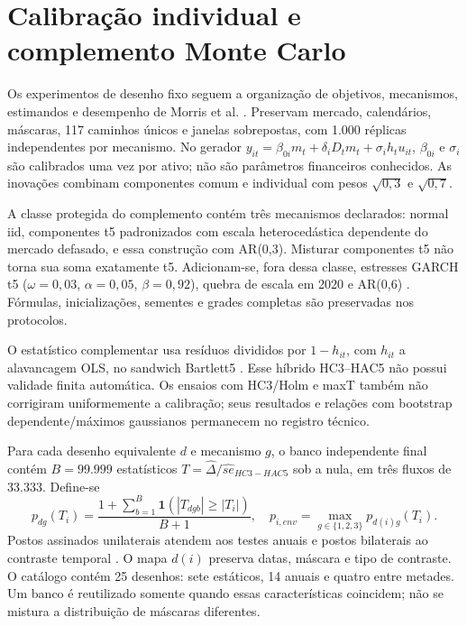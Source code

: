 \section{Calibração individual e complemento Monte Carlo}
Os experimentos de desenho fixo seguem a organização de objetivos,
mecanismos, estimandos e desempenho de Morris et al. \cite{morris2019}.
Preservam mercado, calendários, máscaras, 117 caminhos únicos e janelas
sobrepostas, com 1.000 réplicas independentes por mecanismo.
No gerador $y_{it}=\beta_{0i}m_t+\delta_iD_tm_t+\sigma_i h_tu_{it}$,
$\beta_{0i}$ e $\sigma_i $ são calibrados uma vez por ativo; não são
parâmetros financeiros conhecidos. As inovações combinam componentes
comum e individual com pesos $\sqrt{0,3}$ e $\sqrt{0,7}$.

A classe protegida do complemento contém três mecanismos declarados:
normal iid, componentes t5 padronizados com escala heterocedástica
dependente do mercado defasado, e essa construção com AR(0,3).
Misturar componentes t5 não torna sua soma exatamente t5.
Adicionam-se, fora dessa classe, estresses GARCH t5
($\omega=0,03$, $\alpha=0,05$, $\beta=0,92$), quebra de escala
em 2020 e AR(0,6) \cite{bollerslev1986}. Fórmulas, inicializações,
sementes e grades completas são preservadas nos protocolos.

O estatístico complementar usa resíduos divididos por $1-h_{it}$,
com $h_{it}$ a alavancagem OLS, no sandwich Bartlett5
\cite{mackinnonwhite1985}. Esse híbrido HC3--HAC5 não possui
validade finita automática. Os ensaios com HC3/Holm e maxT também
não corrigiram uniformemente a calibração; seus resultados e relações
com bootstrap dependente/máximos gaussianos
\cite{shao2010,chernozhukov2013} permanecem no registro técnico.

Para cada desenho equivalente $d $ e mecanismo $g $, o banco independente final contém
$B=99.999$ estatísticos $T=\widehat\Delta/\widehat{se}_{HC3-HAC5}$
sob a nula, em três fluxos de 33.333. Define-se
\begin{equation}
p_{dg}(T_i)=\frac{1+\sum_{b=1}^{B}\mathbf{1}(|T_{dgb}|\ge|T_i|)}{B+1},
\quad p_{i,env}=\max_{g\in\{1,2,3\}}p_{d(i)g}(T_i).
\end{equation}
Postos assinados unilaterais atendem aos testes anuais e postos
bilaterais ao contraste temporal \cite{dufour2006,phipson2010}.
O mapa $d(i)$ preserva datas, máscara e tipo de contraste. O catálogo
contém 25 desenhos: sete estáticos, 14 anuais e quatro entre metades.
Um banco é reutilizado somente quando essas características coincidem;
não se mistura a distribuição de máscaras diferentes.

